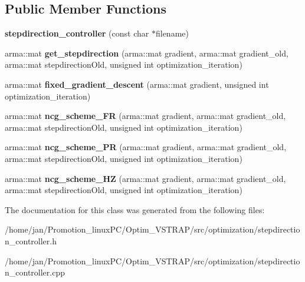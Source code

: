 \subsection*{Public Member Functions}
\begin{DoxyCompactItemize}
\item 
\mbox{\label{classstepdirection__controller_afd3bc683ac79057254e6c61d1cfb4c7d}} 
{\bfseries stepdirection\+\_\+controller} (const char $\ast$filename)
\item 
\mbox{\label{classstepdirection__controller_ab2d76b39009f8d6c0121288d79c42a9d}} 
arma\+::mat {\bfseries get\+\_\+stepdirection} (arma\+::mat gradient, arma\+::mat gradient\+\_\+old, arma\+::mat stepdirection\+Old, unsigned int optimization\+\_\+iteration)
\item 
\mbox{\label{classstepdirection__controller_a1acb1237378c492ef44a46f8e5fbfce1}} 
arma\+::mat {\bfseries fixed\+\_\+gradient\+\_\+descent} (arma\+::mat gradient, unsigned int optimization\+\_\+iteration)
\item 
\mbox{\label{classstepdirection__controller_ae98ce04e7e3f100d1572992ab43da38a}} 
arma\+::mat {\bfseries ncg\+\_\+scheme\+\_\+\+FR} (arma\+::mat gradient, arma\+::mat gradient\+\_\+old, arma\+::mat stepdirection\+Old, unsigned int optimization\+\_\+iteration)
\item 
\mbox{\label{classstepdirection__controller_a63b024e1780f92773e7206f69177af23}} 
arma\+::mat {\bfseries ncg\+\_\+scheme\+\_\+\+PR} (arma\+::mat gradient, arma\+::mat gradient\+\_\+old, arma\+::mat stepdirection\+Old, unsigned int optimization\+\_\+iteration)
\item 
\mbox{\label{classstepdirection__controller_a86875462174e50ae056d7a1fa10ae41b}} 
arma\+::mat {\bfseries ncg\+\_\+scheme\+\_\+\+HZ} (arma\+::mat gradient, arma\+::mat gradient\+\_\+old, arma\+::mat stepdirection\+Old, unsigned int optimization\+\_\+iteration)
\end{DoxyCompactItemize}


The documentation for this class was generated from the following files\+:\begin{DoxyCompactItemize}
\item 
/home/jan/\+Promotion\+\_\+linux\+P\+C/\+Optim\+\_\+\+V\+S\+T\+R\+A\+P/src/optimization/stepdirection\+\_\+controller.\+h\item 
/home/jan/\+Promotion\+\_\+linux\+P\+C/\+Optim\+\_\+\+V\+S\+T\+R\+A\+P/src/optimization/stepdirection\+\_\+controller.\+cpp\end{DoxyCompactItemize}
